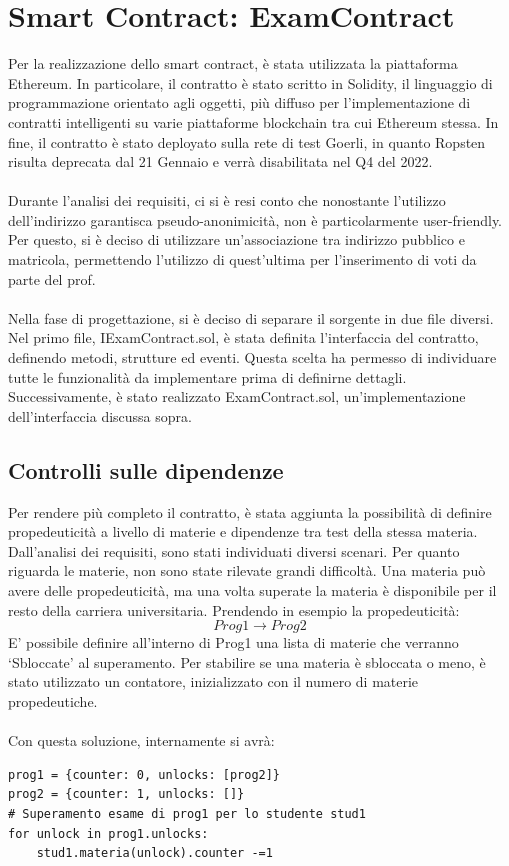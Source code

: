 \section{Smart Contract: ExamContract}

Per la realizzazione dello smart contract, è stata utilizzata la piattaforma Ethereum. In particolare, il contratto è stato scritto in Solidity, il linguaggio di programmazione orientato agli oggetti, più diffuso per l'implementazione di contratti intelligenti su varie piattaforme blockchain tra cui Ethereum stessa. In fine, il contratto è stato deployato sulla rete di test Goerli, in quanto Ropsten risulta deprecata dal 21 Gennaio e verrà disabilitata nel Q4 del 2022.\\
\\
Durante l'analisi dei requisiti, ci si è resi conto che nonostante l'utilizzo dell'indirizzo garantisca pseudo-anonimicità, non è particolarmente user-friendly. Per questo, si è deciso di utilizzare un'associazione tra indirizzo pubblico e matricola, permettendo l'utilizzo di quest'ultima per l'inserimento di voti da parte del prof.\\
\\
Nella fase di progettazione, si è deciso di separare il sorgente in due file diversi. Nel primo file, IExamContract.sol, è stata definita l'interfaccia del contratto, definendo metodi, strutture ed eventi. Questa scelta ha permesso di individuare tutte le funzionalità da implementare prima di definirne dettagli. Successivamente, è stato realizzato ExamContract.sol, un'implementazione dell'interfaccia discussa sopra.

\subsection{Controlli sulle dipendenze}
Per rendere più completo il contratto, è stata aggiunta la possibilità di definire propedeuticità a livello di materie e dipendenze tra test della stessa materia. Dall'analisi dei requisiti, sono stati individuati diversi scenari.
Per quanto riguarda le materie, non sono state rilevate grandi difficoltà.
Una materia può avere delle propedeuticità, ma una volta superate la materia è disponibile per il resto della carriera universitaria.
Prendendo in esempio la propedeuticità:
$$
    Prog1 \rightarrow Prog2
$$
E' possibile definire all'interno di Prog1 una lista di materie che verranno `Sbloccate' al superamento. Per stabilire se una materia è sbloccata o meno, è stato utilizzato un contatore, inizializzato con il numero di materie propedeutiche.
\pagebreak\\
\\
Con questa soluzione, internamente si avrà:
\begin{verbatim}
prog1 = {counter: 0, unlocks: [prog2]}
prog2 = {counter: 1, unlocks: []}
# Superamento esame di prog1 per lo studente stud1
for unlock in prog1.unlocks:
    stud1.materia(unlock).counter -=1
\end{verbatim}



